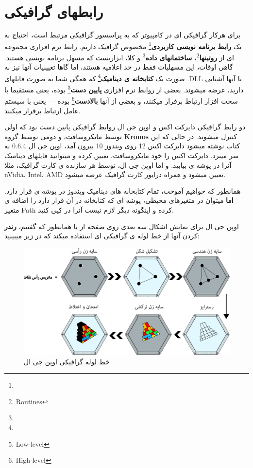 \documentclass[14pt,a4paper]{memoir}
\begin{document}
	 \section{رابطهای گرافیکی}\label{api}	 
	  
	  
	  برای هرکار گرافیکی ای در کامپیوتر که به پراسسور گرافیکی مرتبط است، احتیاج به یک \textbf{رابط برنامه نویسی کاربردی}\footnote{} مخصوص گرافیک داریم. رابط نرم افزاری مجموعه ای از \textbf{روتینها}\footnote{Routines}، \textbf{ساختمانهای داده}\footnote{} و کلا، ابزاریست که مسهل برنامه نویسی هستند. گاهی اوقات، این مسهلیات فقط در حد اعلامیه هستند، اما گاها تعیینیات آنها نیز به صورت یک \textbf{کتابخانه ی دینامیک}\footnote{} که همگی شما به صورت فایلهای .DLL با آنها آشنایی دارید، عرضه میشوند. بعضی از روابط نرم افزاری \textbf{پایین دست}\footnote{Low-level} بوده، یعنی مستقیما با سخت افزار ارتباط برقرار میکنند، و بعضی از آنها \textbf{بالادست}\footnote{High-level} بوده --- یعنی با سیستم عامل ارتباط برقرار میکنند. 
	  
	  
	 دو رابط گرافیکی دایرکت اکس و  اوپن جی ال روابط گرافیکی پایین دست بود که اولی توسط مایکروسافت، و دومی توسط گروه \textbf{Kronos} کنترل میشوند. در حالی که این کتاب نوشته میشود دایرکت اکس 12 روی ویندوز 10 بیرون آمد، اوپن جی ال 0.6.4 به سر میبرد. دایرکت اکس را خود مایکروسافت، تعیین کرده و میتوانید فایلهای دینامیک آنرا در پوشه ی \textbf{} بیابید. و اما اوپن جی ال، توسط هر سازنده ی کارت گرافیک، مثلا nVidia، Intel، AMD تعیین میشود و همراه درایور کارت گرافیک عرضه میشود.
	 
	 \begin{tip}
	 	همانطور که خواهیم آموخت، تمام کتابخانه های دینامیک ویندوز در پوشه ی   قرار دارد. \textbf{اما} میتوان در متغیرهای محیطی، پوشه ای که کتابخانه در آن قرار دارد را اضافه ی متغیر Path کرده و اینگونه دیگر لازم نیست آنرا در  کپی کنید.
	 \end{tip} 
	 
	 
	 
	 اوپن جی ال برای نمایش اشکال سه بعدی روی صفحه از یا همانطور که گفتیم، \textbf{رندر} کردن آنها از خط لوله ی گرافیکی ای استفاده میکند که در زیر میبینید:
	 
	 
	 
	 \begin{figure}[H]
	 	\centering
	 	\includegraphics[scale=0.4]{Pipeline}
	 	\caption{خط لوله گرافیکی اوپن جی ال}
	 \end{figure}
	 
\end{document}
